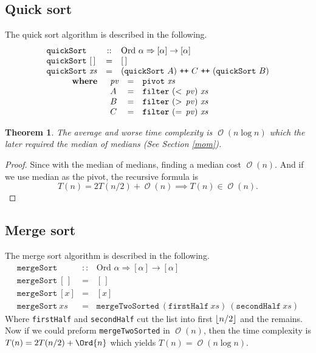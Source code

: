 \documentclass[12pt, a4paper]{article}
\DeclarePairedDelimiter{\floor}{\lfloor}{\rfloor}
\newcommand{\opord}{\operatorname{\mathcal{O}}}
\newcommand{\ord}[1]{\opord\left(#1\right)}
\newtheorem{theorem}{Theorem}
\begin{document}
\setcounter{section}{5}
\subsection{Quick sort}
The quick sort algorithm is described in the following.
\newcommand\xs{\mathit{xs}}
\newcommand\ys{\mathit{ys}}
\newcommand\pv{\mathit{pv}}
\[
  \begin{array}{lcl}
    \mathtt{quickSort} & :: & \text{Ord } \alpha \Rightarrow [\alpha] \to [\alpha] \\
   \mathtt{quickSort} \  [\,] & = & [\,] \\
   \mathtt{quickSort} \  \xs & = & 
   (\mathtt{quickSort} \ A) \ \texttt{++}\ C \ \texttt{++}\ (\mathtt{quickSort} \ B) \\
    \hspace*{30pt} \text{\bf where} & \multicolumn{2}{l}{
      \begin{array}[t]{lcl}
        \pv & = & \mathtt{pivot} \ \xs \\
        A & = & \mathtt{filter} \ (< \,\pv) \ \xs \\
        B & = & \mathtt{filter} \ (> \,\pv) \ \xs \\
        C & = & \mathtt{filter} \ (= \,\pv) \ \xs \\
      \end{array}
    }
  \end{array}
\]

\begin{theorem}
The average and worse time complexity is $\ord{n \log n}$ which the later required the median 
of medians (See Section \ref{mom}).
\end{theorem}
\begin{proof}
  Since with the median of medians, finding a median cost $\ord{n}$. And if we use median 
  as the pivot, the recursive formula is 
  \[ T(n) = 2T(n/2) + \ord{n} \implies T(n) \in \ord{n}. \]
\end{proof}

\subsection{Merge sort}
The merge sort algorithm is described in the following.
\[
  \begin{array}{lcl}
    \mathtt{mergeSort} & :: & \text{Ord } \alpha \Rightarrow [\alpha] \to [\alpha] \\
   \mathtt{mergeSort} \  [\,] & = & [\,] \\
   \mathtt{mergeSort} \  [x] & = & [x] \\
   \mathtt{mergeSort} \  \xs & = & \mathtt{mergeTwoSorted} \  
    (\mathtt{firstHalf} \  \xs) \  (\mathtt{secondHalf} \  \xs)
  \end{array}
\]
Where \texttt{firstHalf} and \texttt{secondHalf} cut the list into first $\floor{n/2}$ and 
the remains. Now if we could preform \texttt{mergeTwoSorted} in $\ord{n}$, then the 
time complexity is $T(n) = 2T(n/2) + \Ord{n}$ which yields $T(n) = \ord{n \log n}$.
\end{document}

